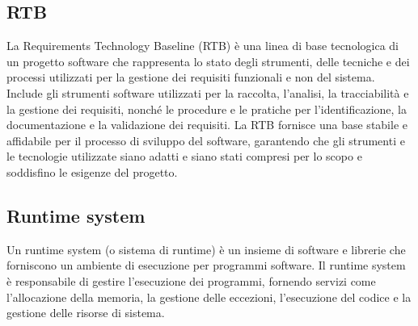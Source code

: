\subsection*{RTB} 
La Requirements Technology Baseline (RTB) è una linea di base tecnologica di un progetto software che rappresenta lo stato degli strumenti, delle tecniche e dei processi utilizzati per la gestione dei requisiti funzionali e non del sistema. Include gli strumenti software utilizzati per la raccolta, l'analisi, la tracciabilità e la gestione dei requisiti, nonché le procedure e le pratiche per l'identificazione, la documentazione e la validazione dei requisiti. La RTB fornisce una base stabile e affidabile per il processo di sviluppo del software, garantendo che gli strumenti e le tecnologie utilizzate siano adatti e siano stati compresi per lo scopo e soddisfino le esigenze del progetto.
\subsection*{Runtime system} 
Un runtime system (o sistema di runtime) è un insieme di software e librerie che forniscono un ambiente di esecuzione per programmi software. Il runtime system è responsabile di gestire l'esecuzione dei programmi, fornendo servizi come l'allocazione della memoria, la gestione delle eccezioni, l'esecuzione del codice e la gestione delle risorse di sistema.
